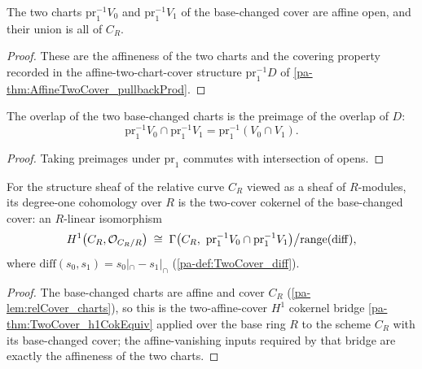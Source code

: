 \begin{lemma}
  \label{pa-lem:relCover_charts}
  \leanok

  The two charts \(\mathrm{pr}_1^{-1} V_0\) and \(\mathrm{pr}_1^{-1} V_1\) of the base-changed cover
  are affine open, and their union is all of \(C_R\).
\end{lemma}
\begin{proof}
  \leanok
  These are the affineness of the two charts and the covering property recorded in the
  affine-two-chart-cover structure \(\mathrm{pr}_1^{-1} D\) of \ref{pa-thm:AffineTwoCover_pullbackProd}.
\end{proof}

\begin{lemma}
  \label{pa-lem:relCover_inf}
  \leanok

  The overlap of the two base-changed charts is the preimage of the overlap of \(D\):
  \[
    \mathrm{pr}_1^{-1} V_0 \cap \mathrm{pr}_1^{-1} V_1 = \mathrm{pr}_1^{-1}(V_0 \cap V_1).
  \]
\end{lemma}
\begin{proof}
  \leanok
  Taking preimages under \(\mathrm{pr}_1\) commutes with intersection of opens.
\end{proof}

\begin{definition}
  \label{pa-def:relTwoCoverH1}
  \leanok

  For the structure sheaf of the relative curve \(C_R\) viewed as a sheaf of \(R\)-modules, its
  degree-one cohomology over \(R\) is the two-cover cokernel of the base-changed cover: an
  \(R\)-linear isomorphism
  \[
    H^1\bigl(C_R, \mathcal{O}_{C_R/R}\bigr) \;\cong\;
      \Gamma\bigl(C_R,\ \mathrm{pr}_1^{-1}V_0 \cap \mathrm{pr}_1^{-1}V_1\bigr)\big/
        \mathrm{range}(\mathrm{diff}),
  \]
  where \(\mathrm{diff}(s_0,s_1) = s_0|_\cap - s_1|_\cap\) (\ref{pa-def:TwoCover_diff}).
\end{definition}
\begin{proof}
  \leanok
  The base-changed charts are affine and cover \(C_R\) (\ref{pa-lem:relCover_charts}), so this is the
  two-affine-cover \(H^1\) cokernel bridge \ref{pa-thm:TwoCover_h1CokEquiv} applied over the base ring
  \(R\) to the scheme \(C_R\) with its base-changed cover; the affine-vanishing inputs required by
  that bridge are exactly the affineness of the two charts.
\end{proof}

